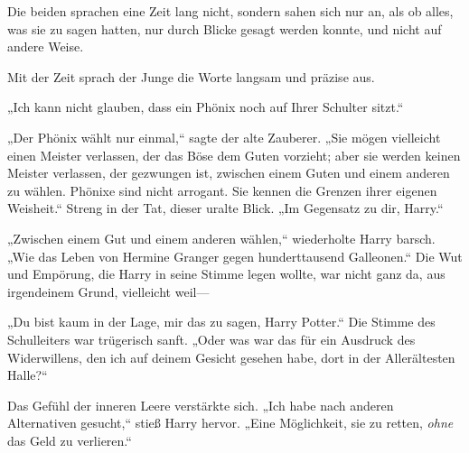 Die beiden sprachen eine Zeit lang nicht, sondern sahen sich nur an, als ob alles, was sie zu sagen hatten, nur durch Blicke gesagt werden konnte, und nicht auf andere Weise.

Mit der Zeit sprach der Junge die Worte langsam und präzise aus.

„Ich kann nicht glauben, dass ein Phönix noch auf Ihrer Schulter sitzt.“

„Der Phönix wählt nur einmal,“ sagte der alte Zauberer. „Sie mögen vielleicht einen Meister verlassen, der das Böse dem Guten vorzieht; aber sie werden keinen Meister verlassen, der gezwungen ist, zwischen einem Guten und einem anderen zu wählen. Phönixe sind nicht arrogant. Sie kennen die Grenzen ihrer eigenen Weisheit.“
Streng in der Tat, dieser uralte Blick. „Im Gegensatz zu dir, Harry.“

„Zwischen einem Gut und einem anderen wählen,“ wiederholte Harry barsch. „Wie das Leben von Hermine Granger gegen hunderttausend Galleonen.“
Die Wut und Empörung, die Harry in seine Stimme legen wollte, war nicht ganz da, aus irgendeinem Grund, vielleicht weil—

„Du bist kaum in der Lage, mir das zu sagen, Harry Potter.“
Die Stimme des Schulleiters war trügerisch sanft.
„Oder was war das für ein Ausdruck des Widerwillens, den ich auf deinem Gesicht gesehen habe, dort in der Allerältesten Halle?“

Das Gefühl der inneren Leere verstärkte sich.
„Ich habe nach anderen Alternativen gesucht,“ stieß Harry hervor. „Eine Möglichkeit, sie zu retten, \emph{ohne} das Geld zu verlieren.“

